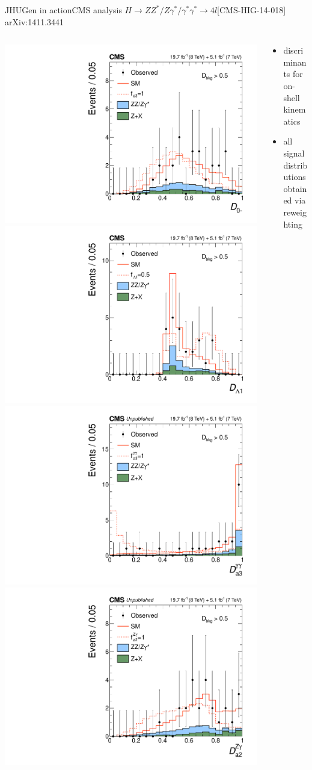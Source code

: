 \documentclass[usenames,dvipsnames,svgnames,table]{beamer}
\begin{document}
\begin{frame}{JHUGen in action}{CMS analysis $H \to ZZ^*/Z\gamma^*/\gamma^*\gamma^* \to 4l$\hfill [CMS-HIG-14-018] arXiv:1411.3441}
\begin{columns}
\begin{column}{0.6\textwidth}
\includegraphics[width=.5\columnwidth]{HVV/d0minus}
\includegraphics[width=.5\columnwidth]{HVV/dlambda1} \\
\includegraphics[width=.5\columnwidth]{reweighting/HVV/Da3gammagamma}
\includegraphics[width=.5\columnwidth]{reweighting/HVV/Da2Zgamma}
\end{column}
\begin{column}{0.4\textwidth}
\begin{itemize}
\item discriminants for on-shell kinematics
\item all signal distributions obtained via reweighting
\end{itemize}
\end{column}
\end{columns}
\end{frame}
\end{document}
